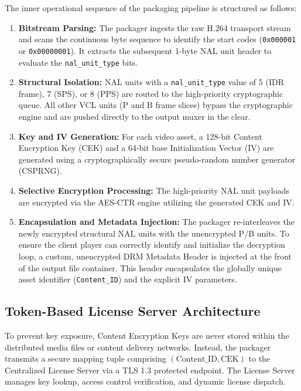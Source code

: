 The inner operational sequence of the packaging pipeline is structured as follows:
\begin{enumerate}
    \item \textbf{Bitstream Parsing:} The packager ingests the raw H.264 transport stream and scans the continuous byte sequence to identify the start codes (\texttt{0x000001} or \texttt{0x00000001}). It extracts the subsequent 1-byte NAL unit header to evaluate the \texttt{nal\_unit\_type} bits.
    \item \textbf{Structural Isolation:} NAL units with a \texttt{nal\_unit\_type} value of 5 (IDR frame), 7 (SPS), or 8 (PPS) are routed to the high-priority cryptographic queue. All other VCL units (P and B frame slices) bypass the cryptographic engine and are pushed directly to the output muxer in the clear.
    \item \textbf{Key and IV Generation:} For each video asset, a 128-bit Content Encryption Key (CEK) and a 64-bit base Initialization Vector (IV) are generated using a cryptographically secure pseudo-random number generator (CSPRNG).
    \item \textbf{Selective Encryption Processing:} The high-priority NAL unit payloads are encrypted via the AES-CTR engine utilizing the generated CEK and IV.
    \item \textbf{Encapsulation and Metadata Injection:} The packager re-interleaves the newly encrypted structural NAL units with the unencrypted P/B units. To ensure the client player can correctly identify and initialize the decryption loop, a custom, unencrypted DRM Metadata Header is injected at the front of the output file container. This header encapsulates the globally unique asset identifier (\texttt{Content\_ID}) and the explicit $\text{IV}$ parameters.
\end{enumerate}

\subsection{Token-Based License Server Architecture}
To prevent key exposure, Content Encryption Keys are never stored within the distributed media files or content delivery networks. Instead, the packager transmits a secure mapping tuple comprising $(\text{Content\_ID}, \text{CEK})$ to the Centralized License Server via a TLS 1.3 protected endpoint. The License Server manages key lookup, access control verification, and dynamic license dispatch.

